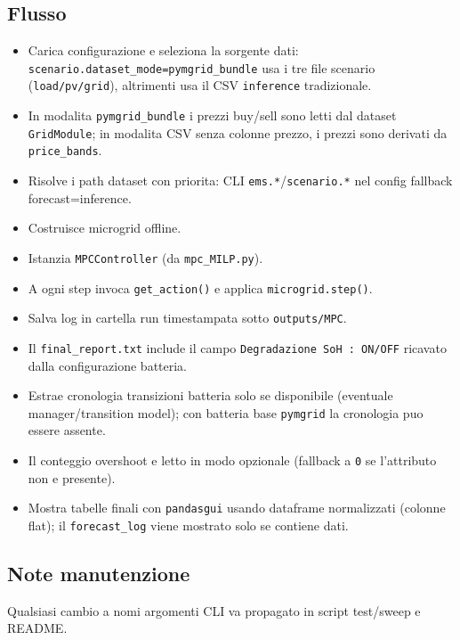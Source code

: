 \subsection*{Flusso}
\begin{itemize}[leftmargin=1.2cm]
\item Carica configurazione e seleziona la sorgente dati:
\texttt{scenario.dataset\_mode=pymgrid\_bundle} usa i tre file scenario (\texttt{load/pv/grid}),
altrimenti usa il CSV \texttt{inference} tradizionale.
\item In modalita \texttt{pymgrid\_bundle} i prezzi buy/sell sono letti dal dataset \texttt{GridModule};
in modalita CSV senza colonne prezzo, i prezzi sono derivati da \texttt{price\_bands}.
\item Risolve i path dataset con priorita:
CLI \textrightarrow{} \texttt{ems.*}/\texttt{scenario.*} nel config \textrightarrow{} fallback forecast=inference.
\item Costruisce microgrid offline.
\item Istanzia \texttt{MPCController} (da \texttt{mpc\_MILP.py}).
\item A ogni step invoca \texttt{get\_action()} e applica \texttt{microgrid.step()}.
\item Salva log in cartella run timestampata sotto \texttt{outputs/MPC}.
\item Il \texttt{final\_report.txt} include il campo \texttt{Degradazione SoH : ON/OFF} ricavato dalla configurazione batteria.
\item Estrae cronologia transizioni batteria solo se disponibile (eventuale manager/transition model); con batteria base \texttt{pymgrid} la cronologia puo essere assente.
\item Il conteggio overshoot e letto in modo opzionale (fallback a \texttt{0} se l'attributo non e presente).
\item Mostra tabelle finali con \texttt{pandasgui} usando dataframe normalizzati (colonne flat); il \texttt{forecast\_log} viene mostrato solo se contiene dati.
\end{itemize}

\subsection*{Note manutenzione}
Qualsiasi cambio a nomi argomenti CLI va propagato in script test/sweep e README.

